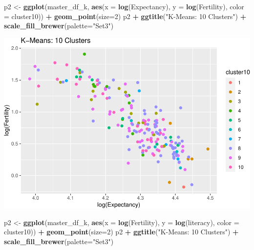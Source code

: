 \documentclass[]{article}
\newenvironment{Shaded}{\begin{snugshade}}{\end{snugshade}}
\newcommand{\DataTypeTok}[1]{\textcolor[rgb]{0.13,0.29,0.53}{#1}}
\newcommand{\DecValTok}[1]{\textcolor[rgb]{0.00,0.00,0.81}{#1}}
\newcommand{\KeywordTok}[1]{\textcolor[rgb]{0.13,0.29,0.53}{\textbf{#1}}}
\newcommand{\NormalTok}[1]{#1}
\newcommand{\OperatorTok}[1]{\textcolor[rgb]{0.81,0.36,0.00}{\textbf{#1}}}
\newcommand{\StringTok}[1]{\textcolor[rgb]{0.31,0.60,0.02}{#1}}
\begin{document}
\begin{Shaded}
\begin{Highlighting}[]
\NormalTok{p2 <-}\StringTok{ }\KeywordTok{ggplot}\NormalTok{(master_df_k, }\KeywordTok{aes}\NormalTok{(}\DataTypeTok{x =} \KeywordTok{log}\NormalTok{(Expectancy), }\DataTypeTok{y =} \KeywordTok{log}\NormalTok{(Fertility), }\DataTypeTok{color =}\NormalTok{ cluster10)) }\OperatorTok{+}
\StringTok{  }\KeywordTok{geom_point}\NormalTok{(}\DataTypeTok{size=}\DecValTok{2}\NormalTok{)}
\NormalTok{p2 }\OperatorTok{+}\StringTok{ }\KeywordTok{ggtitle}\NormalTok{(}\StringTok{"K-Means: 10 Clusters"}\NormalTok{) }\OperatorTok{+}\StringTok{ }\KeywordTok{scale_fill_brewer}\NormalTok{(}\DataTypeTok{palette=}\StringTok{"Set3"}\NormalTok{)}
\end{Highlighting}
\end{Shaded}

\includegraphics{eda_files/figure-latex/unnamed-chunk-30-9.pdf}

\begin{Shaded}
\begin{Highlighting}[]
\NormalTok{p2 <-}\StringTok{ }\KeywordTok{ggplot}\NormalTok{(master_df_k, }\KeywordTok{aes}\NormalTok{(}\DataTypeTok{x =} \KeywordTok{log}\NormalTok{(Fertility), }\DataTypeTok{y =} \KeywordTok{log}\NormalTok{(literacy), }\DataTypeTok{color =}\NormalTok{ cluster10)) }\OperatorTok{+}
\StringTok{  }\KeywordTok{geom_point}\NormalTok{(}\DataTypeTok{size=}\DecValTok{2}\NormalTok{)}
\NormalTok{p2 }\OperatorTok{+}\StringTok{ }\KeywordTok{ggtitle}\NormalTok{(}\StringTok{"K-Means: 10 Clusters"}\NormalTok{) }\OperatorTok{+}\StringTok{ }\KeywordTok{scale_fill_brewer}\NormalTok{(}\DataTypeTok{palette=}\StringTok{"Set3"}\NormalTok{)}
\end{Highlighting}
\end{Shaded}
\end{document}
